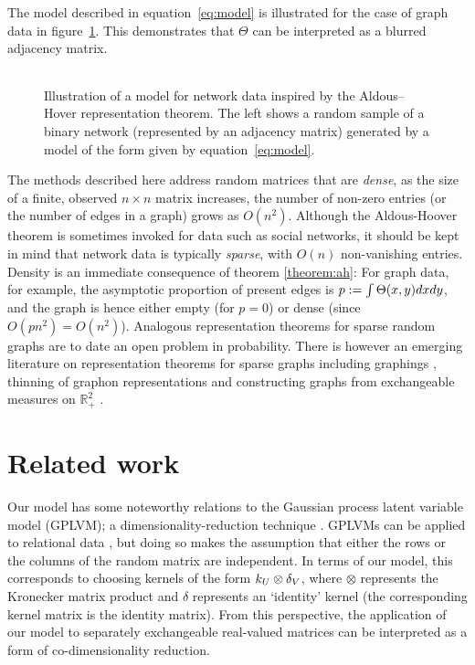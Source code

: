 The model described in equation~\ref{eq:model} is illustrated for the case of graph data in figure~\ref{fig:networks:graphon}.
This demonstrates that $\Theta$ can be interpreted as a blurred adjacency matrix.

\begin{figure}[ht]
\centering
\begin{tabular}{c}

\end{tabular}
\caption[Illustration of the Aldous--Hoover representation of a network.]{
Illustration of a model for network data inspired by the Aldous--Hover representation theorem.
The left shows a random sample of a binary network (represented by an adjacency matrix) generated by a model of the form given by equation~\eqref{eq:model}.
}
\label{fig:networks:graphon}
\end{figure}

\begin{rem}
  The methods described here address random matrices that are \emph{dense}, \ie as the size of a finite, observed $n\times n$ matrix increases,
  the number of non-zero entries (or the number of edges in a graph) grows as $O(n^2)$. Although the Aldous-Hoover theorem is sometimes invoked
  for data such as social networks, it should be kept in mind that network data is typically \emph{sparse}, with $O(n)$ non-vanishing entries.
  Density is an immediate consequence of theorem \ref{theorem:ah}: For graph data, for example, the asymptotic proportion of present edges is
  ${p:=\int\Theta(x,y)dxdy}$, and the graph is hence either empty (for $p=0$) or dense (since
  $O(pn^2)=O(n^2)$). Analogous representation theorems for sparse random graphs are to date an open problem in probability.
  There is however an emerging literature on representation theorems for sparse graphs including graphings \citep[e.g.][]{Lovasz2012-df}, thinning of graphon representations \citep{Wolfe2013-vs} and constructing graphs from exchangeable measures on $\mathbb{R}_+^2$ \citep{Caron2014-on}.
\end{rem}

\section{Related work}
\label{sec:networks:related}

Our model has some noteworthy relations to the Gaussian process latent variable model (GPLVM); a dimensionality-reduction technique \citep[e.g.][]{Lawrence2005-cn}.
GPLVMs can be applied to relational data \citep{Lawrence2009-za}, but doing so makes the assumption that either the rows or the columns of the random matrix are independent. 
In terms of our model, this corresponds to choosing kernels of the form $k_U \otimes \delta_V$, where $\otimes$ represents the Kronecker matrix product and $\delta$ represents an `identity' kernel (\ie the corresponding kernel matrix is the identity matrix).
From this perspective, the application of our model to separately exchangeable real-valued matrices can be interpreted as a form of co-dimensionality reduction. 


